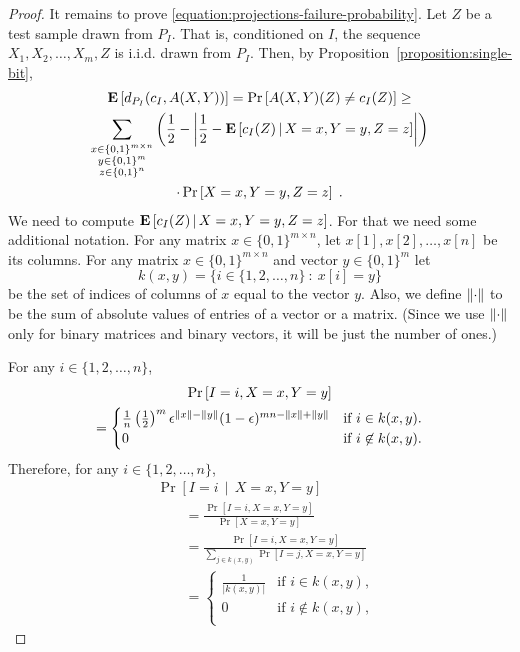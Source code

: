 \begin{proof}
It remains to prove \eqref{equation:projections-failure-probability}. Let $Z$ be
a test sample drawn from $P_I$. That is, conditioned on $I$, the sequence $X_1,
X_2, \dots, X_m, Z$ is i.i.d. drawn from $P_I$. Then, by
Proposition~\ref{proposition:single-bit},
\begin{multline}
\label{equation:projections-expected-error-lower-bound}
\operatorname{\mathbf{E}} \left[d_{P_I}(c_I, A(X,Y))\right]
= \Pr\left[ A(X,Y)(Z) \neq c_I(Z) \right] \ge \\
\sum_{\substack{x \in \{0,1\}^{m \times n} \\ y \in \{0,1\}^m \\ z \in \{0,1\}^n}} \left( \frac{1}{2} - \left| \frac{1}{2} - \operatorname{\mathbf{E}}\left[ c_I(Z) \, \middle| \, X = x, Y = y, Z = z \right] \right| \right)
\\ \cdot \Pr \left[X = x, Y = y, Z = z \right]  \; .
\end{multline}
We need to compute $\operatorname{\mathbf{E}}\left[ c_I(Z) \, \middle| \, X = x, Y = y, Z = z \right]$.
For that we need some additional notation.
For any matrix $x \in \{0,1\}^{m \times n}$, let $x[1], x[2], \dots, x[n]$ be its columns.
For any matrix $x \in \{0,1\}^{m \times n}$ and vector $y \in \{0,1\}^m$ let
$$
k(x,y) = \{ i \in \{1,2,\dots,n\} ~:~ x[i] = y \}
$$
be the set of indices of columns of $x$ equal to the vector $y$. Also, we define
$\left\| \cdot \right\|$ to be the sum of absolute values of entries of a vector or a
matrix. (Since we use $\left\| \cdot \right\|$ only for binary matrices and binary
vectors, it will be just the number of ones.)

For any $i \in \{1,2,\dots,n\}$,
\begin{multline*}
\Pr \left[I = i, X = x, Y = y \right] \\
=
\begin{cases}
\frac{1}{n} \left( \frac{1}{2} \right)^m \epsilon^{\left\| x \right\| - \left\| y \right\|} (1 - \epsilon)^{mn - \left\| x \right\| + \left\| y \right\|} & \text{if $i \in k(x,y)$.} \\
0 & \text{if $i \not \in k(x,y)$.} \\
\end{cases}
\end{multline*}
Therefore, for any $i \in \{1,2,\dots,n\}$,
\begin{align*}
& \Pr \left[I = i \, \middle| \, X = x, Y = y \right] \\
& \qquad = \frac{\Pr \left[I = i, X = x, Y = y \right]}{\Pr \left[ X = x, Y = y \right]} \\
& \qquad = \frac{\Pr \left[I = i, X = x, Y = y \right]}{\sum_{j \in k(x,y)} \Pr \left[ I = j, X = x, Y = y \right]} \\
& \qquad =
\begin{cases}
\frac{1}{|k(x,y)|} & \text{if $i \in k(x,y)$,} \\
0 & \text{if $i \not \in k(x,y)$,} \\
\end{cases}
\end{align*}


\end{proof}
